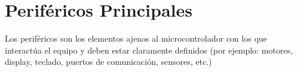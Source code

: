 \section{Periféricos Principales}
    Los periféricos son los elementos ajenos al microcontrolador con los que
    interactúa el equipo y deben estar claramente definidos (por ejemplo:
    motores, display, teclado, puertos de comunicación, sensores, etc.)



